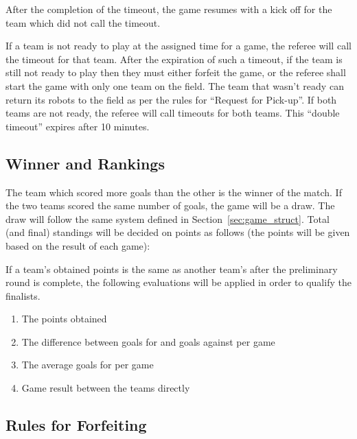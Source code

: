 \documentclass[12pt]{article}
\begin{document}
After the completion of the timeout, the game resumes with a kick off for the team which did not call the timeout.

If a team is not ready to play at the assigned time for a game, the referee will call the timeout for that team. After the expiration of such a timeout, if the team is still not ready to play then they must either forfeit the game, or the referee shall start the game with only one team on the field.  The team that wasn't ready can return its robots to the field as per the rules for ``Request for Pick-up''. If both teams are not ready, the referee will call timeouts for both teams. This ``double timeout'' expires after 10 minutes.

\subsection{Winner and Rankings}

The team which scored more goals than the other is the winner of the match. If the two teams scored the same number of goals, the game will be a draw. The draw will follow the same system defined in Section~\ref{sec:game_struct}. Total (and final) standings will be decided on points as follows (the points will be given based on the result of each game):


If a team's obtained points is the same as another team's after the preliminary round is complete, the following evaluations will be applied in order to qualify the finalists.

\begin{enumerate}

\item The points obtained

\item The difference between goals for and goals against per game

\item The average goals for per game

\item Game result between the teams directly

\end{enumerate}

\subsection{Rules for Forfeiting}
\label{sec:forfeit}
\end{document}
